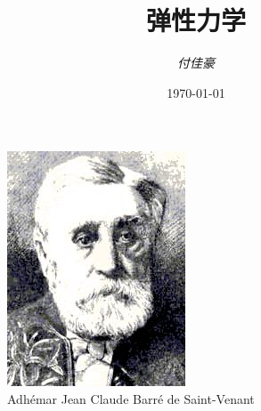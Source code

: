 \documentclass[geye,green,normal,cn]{elegantnote}
\title{\bfseries 弹性力学}
\author{{\itshape 付佳豪}}
\date{\today}
\begin{document}
{\color{ecolor}{\maketitle}}
\begin{figure}[!h]
\centering
\includegraphics[scale=1]{figure/1.jpg}
\caption{Adhémar Jean Claude Barré de Saint-Venant}
\end{figure}
%
%
%

\end{document}

